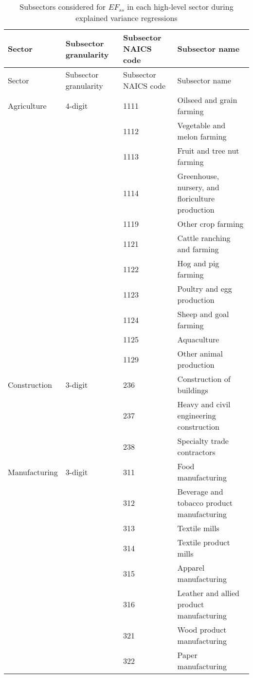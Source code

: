 \begin{longtable}{l l l l}
\caption{Subsectors considered for $EF_{ss}$ in each high-level sector during explained variance regressions} \label{tab:subsectors_table} \\
    \hline
    Sector & Subsector granularity & Subsector NAICS code & Subsector name \\
    \hline
    \endfirsthead
    
    \hline
    Sector & Subsector granularity & Subsector NAICS code & Subsector name \\
    \hline
    \endhead
        Agriculture  & 4-digit & 1111 & Oilseed and grain farming\\
         & & 1112 & Vegetable and melon farming\\
         & & 1113 & Fruit and tree nut farming\\
         & & 1114 & Greenhouse, nursery, and floriculture production\\
         & & 1119 & Other crop farming\\
         & & 1121 & Cattle ranching and farming\\
         & & 1122 & Hog and pig farming\\
         & & 1123 & Poultry and egg production\\
         & & 1124 & Sheep and goal farming\\
         & & 1125 & Aquaculture\\
         & & 1129 & Other animal production\\
        Construction & 3-digit& 236 &  Construction of buildings\\
         & & 237 & Heavy and civil engineering construction \\ 
         & & 238 & Specialty trade contractors\\ 
        Manufacturing & 3-digit & 311 & Food manufacturing\\
         & & 312 & Beverage and tobacco product manufacturing\\
         & & 313 & Textile mills\\
         & & 314 & Textile product mills\\
         & & 315 & Apparel manufacturing\\
         & & 316 & Leather and allied product manufacturing\\
         & & 321 & Wood product manufacturing\\
         & & 322 & Paper manufacturing\\

\end{longtable}
